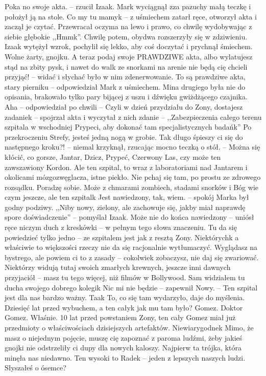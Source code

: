 \documentclass[../MAIN.tex]{subfiles}
\begin{document}
\sx Poka no swoje akta. -- rzucił Izaak. \qd
Mark wyciągnął zza pazuchy małą teczkę i położył ją na stole.
\sx Co my tu mamy\3k -- z uśmiechem zatarł ręce, otworzył akta i zaczął je czytać. \qd
Przewracał oczyma na lewo i prawo, co chwilę wydobywając z siebie głębokie ,,Hmm\3k''. Chwilę potem, obydwa rozszerzyły się w zdziwieniu. Izaak wytężył wzrok, pochylił się lekko, aby coś doczytać i prychnął śmiechem.
%
\sx Wolne żarty, gnojku. A teraz podaj swoje PRAWDZIWE akta, albo wylatujesz stąd na zbity pysk, i nawet do walk ze snorkami na arenie nie będą cię chcieli przyjąć! -- widać i słychać było w nim zdenerwowanie.
\xx To są prawdziwe akta, stary pierniku -- odpowiedział Mark z uśmiechem. Mina drugiego była nie do opisania, brakowało tylko pary bijącej z uszu i dźwięku gwiżdżącego czajnika.
\xx Aha -- odpowiedział po chwili -- Czyli w dzień przydziału do Zony, dostajesz zadanie\3k -- spojrzał akta i wyczytał z nich zdanie -- ,,Zabezpieczenia całego terenu szpitala w wschodniej Prypeci, aby dokonać tam specjalistycznych badań\3k'' Po przekroczeniu Strefy, jesteś jedną nogą w grobie. Tak długo śpieszy ci się do następnego kroku?! -- niemal krzyknął, rzucając mocno teczką o stół. -- Można się kłócić, co gorsze, Jantar, Dzicz, Prypeć, Czerwony Las, czy może ten zawszawiony Kordon. Ale ten szpital, to wraz z laboratoriami nad Jantarem i okolicami mózgozwęglacza, istne piekło. Nie pchaj się tam, po prostu ze zdrowego rozsądku.
\xx Poradzę sobie.
\xx Może z chmarami zombiech, stadami snorków i Bóg wie czym jeszcze, ale ten szpital\3k
\xx Jest nawiedzony, tak, wiem. -- spokój Marka był godny podziwy.
\qd
,,Niby nowy, zielony, ale zachowuje się, jakby miał naprawdę spore doświadczenie'' -- pomyślał Izaak.
%
\sx Może nie do końca nawiedzony -- uniósł ręce niczym duch z kreskówki -- w pełnym tego słowa znaczeniu. Tu da się powiedzieć tylko jedno -- ze szpitalem jest jak z resztą Zony. Niektórych\3k a właściwie to większości rzeczy nie da się racjonalnie wytłumaczyć. Wyglądasz na bystrego, ale powiem ci to z zasady -- cokolwiek zobaczysz, nie daj się zwariować. Niektórzy widują tutaj swoich zmarłych krewnych, jeszcze inni dawnych przyjaciół -- masz tu tego więcej, niż filmów w Bollywood. Sam widziałem tu ducha swojego dobrego kolegi\3k
\xx Nic mi nie będzie -- zapewnił Nowy. -- Ten szpital jest dla nas bardzo ważny.
\xx Taa\3k To, co się tam wydarzyło, daje do myślenia. Dziesięć lat przed wybuchem, a ten cały\3k jak mu tam było?
\xx Gomez. Doktor Gomez.
\xx Właśnie. 10 lat przed powstaniem Zony, ten cały Gomez miał już przedmioty o właściwościach dzisiejszych artefaktów. Niewiarygodne\3k Mimo, że masz o niejednym pojęcie, muszę cię zapoznać z paroma ludźmi, żeby jakieś gnojki nie odstrzeliły ci dupy dla nowych kaloszy. Najpierw ta trójka, która minęła nas niedawno. Ten wysoki to Radek -- jeden z lepszych naszych ludzi. Słyszałeś o ósemce?
\end{document}
